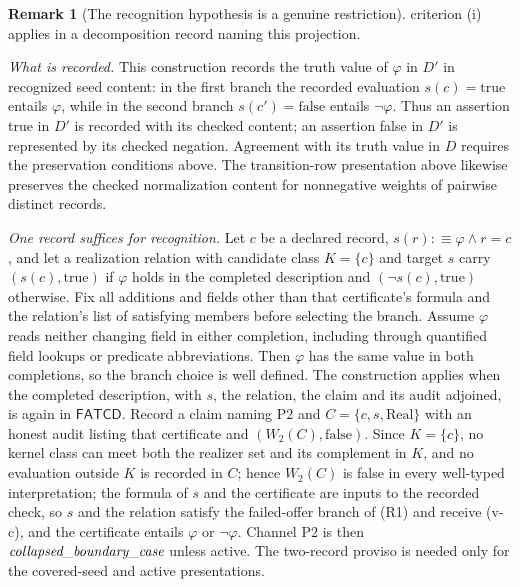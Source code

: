 \documentclass[11pt]{article}
\theoremstyle{definition}
\newtheorem{remark}[theorem]{Remark}
\newcommand{\FATCD}{\ensuremath{\mathsf{FATCD}}}
\newcommand{\collapsedbc}{\textit{collapsed\_\allowbreak boundary\_\allowbreak case}}
\newcommand{\Ptwo}{\ensuremath{\mathrm{P2}}}
\begin{document}
\begin{remark}[The recognition hypothesis is a genuine restriction]
criterion (i) applies in a decomposition record naming this projection. \par\emph{What is recorded.} This construction records the truth value of \(\varphi\) in \(D'\) in recognized
seed content: in the first branch the recorded evaluation \(s(c)=\mathrm{true}\)
entails \(\varphi\), while in the second branch \(s(c')=\mathrm{false}\) entails
\(\neg\varphi\). Thus an assertion true in \(D'\) is recorded with its checked content; an assertion false in \(D'\) is represented by its checked negation. Agreement with its truth value in \(D\) requires the preservation conditions above. The transition-row
presentation above likewise preserves the checked normalization content for
nonnegative weights of pairwise distinct records.

\emph{One record suffices for recognition.} Let \(c\) be a declared record, \(s(r):\equiv\varphi\wedge r=c\), and let a realization relation with candidate class \(K=\{c\}\) and target \(s\) carry \((s(c),\mathrm{true})\) if \(\varphi\) holds in the completed description and \((\neg s(c),\mathrm{true})\) otherwise. Fix all additions and fields other than that certificate's formula and the relation's list of satisfying members before selecting the branch. Assume \(\varphi\) reads neither changing field in either completion, including through quantified field lookups or predicate abbreviations. Then \(\varphi\) has the same value in both completions, so the branch choice is well defined. The construction applies when the completed description, with \(s\), the relation, the claim and its audit adjoined, is again in \FATCD{}. Record a claim naming \Ptwo{} and \(C=\{c,s,\mathrm{Real}\}\) with an honest audit listing that certificate and \((W_2(C),\mathrm{false})\). Since \(K=\{c\}\), no kernel class can meet both the realizer set and its complement in \(K\), and no evaluation outside \(K\) is recorded in \(C\); hence \(W_2(C)\) is false in every well-typed interpretation; the formula of \(s\) and the certificate are inputs to the recorded check, so \(s\) and the relation satisfy the failed-offer branch of (R1) and receive (v-c), and the certificate entails \(\varphi\) or \(\neg\varphi\). Channel \Ptwo{} is then \(\collapsedbc\) unless active. The two-record proviso is needed only for the covered-seed and active presentations.


\end{remark}
\end{document}
